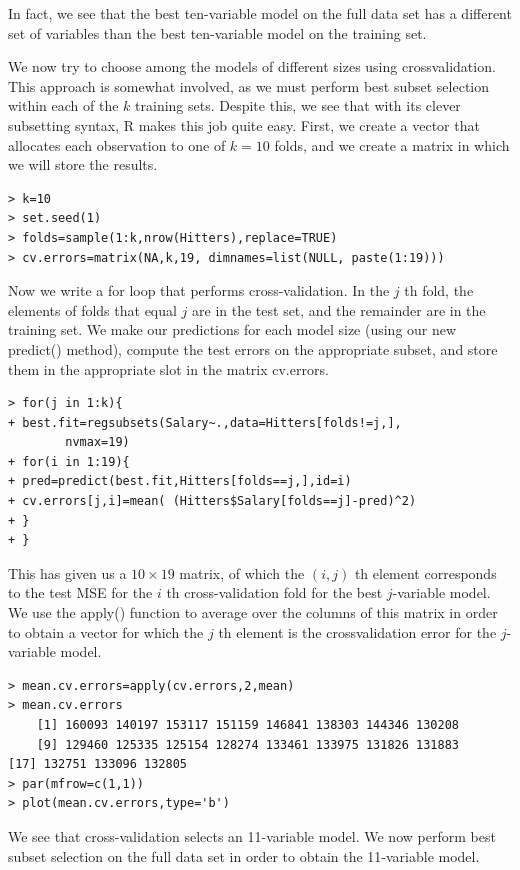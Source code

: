 \documentclass[10pt]{article}
\begin{document}
In fact, we see that the best ten-variable model on the full data set has a different set of variables than the best ten-variable model on the training set.

We now try to choose among the models of different sizes using crossvalidation. This approach is somewhat involved, as we must perform best subset selection within each of the $k$ training sets. Despite this, we see that with its clever subsetting syntax, R makes this job quite easy. First, we create a vector that allocates each observation to one of $k=10$ folds, and we create a matrix in which we will store the results.

\begin{verbatim}
> k=10
> set.seed(1)
> folds=sample(1:k,nrow(Hitters),replace=TRUE)
> cv.errors=matrix(NA,k,19, dimnames=list(NULL, paste(1:19)))
\end{verbatim}

Now we write a for loop that performs cross-validation. In the $j$ th fold, the elements of folds that equal $j$ are in the test set, and the remainder are in the training set. We make our predictions for each model size (using our new predict() method), compute the test errors on the appropriate subset, and store them in the appropriate slot in the matrix cv.errors.

\begin{verbatim}
> for(j in 1:k){
+ best.fit=regsubsets(Salary~.,data=Hitters[folds!=j,],
        nvmax=19)
+ for(i in 1:19){
+ pred=predict(best.fit,Hitters[folds==j,],id=i)
+ cv.errors[j,i]=mean( (Hitters$Salary[folds==j]-pred)^2)
+ }
+ }
\end{verbatim}

This has given us a $10 \times 19$ matrix, of which the $(i, j)$ th element corresponds to the test MSE for the $i$ th cross-validation fold for the best $j$-variable model. We use the apply() function to average over the columns of this matrix in order to obtain a vector for which the $j$ th element is the crossvalidation error for the $j$-variable model.

\begin{verbatim}
> mean.cv.errors=apply(cv.errors,2,mean)
> mean.cv.errors
    [1] 160093 140197 153117 151159 146841 138303 144346 130208
    [9] 129460 125335 125154 128274 133461 133975 131826 131883
[17] 132751 133096 132805
> par(mfrow=c(1,1))
> plot(mean.cv.errors,type='b')
\end{verbatim}

We see that cross-validation selects an 11-variable model. We now perform best subset selection on the full data set in order to obtain the 11-variable model.
\end{document}
